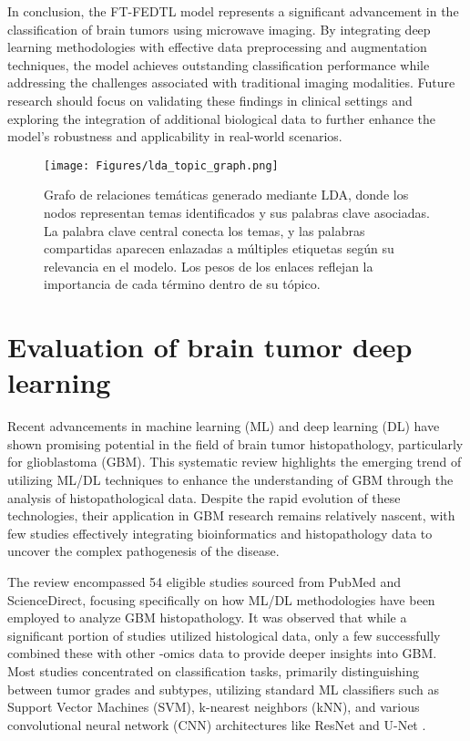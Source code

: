 \documentclass[runningheads]{llncs}
\begin{document}
In conclusion, the FT-FEDTL model represents a significant advancement in the classification of brain tumors using microwave imaging. By integrating deep learning methodologies with effective data preprocessing and augmentation techniques, the model achieves outstanding classification performance while addressing the challenges associated with traditional imaging modalities. Future research should focus on validating these findings in clinical settings and exploring the integration of additional biological data to further enhance the model's robustness and applicability in real-world scenarios.
\begin{figure}[h]
\centering
\texttt{[image: Figures/lda\_topic\_graph.png]}
\caption{Grafo de relaciones temáticas generado mediante LDA, donde los nodos representan temas identificados y sus palabras clave asociadas. La palabra clave central conecta los temas, y las palabras compartidas aparecen enlazadas a múltiples etiquetas según su relevancia en el modelo. Los pesos de los enlaces reflejan la importancia de cada término dentro de su tópico.}
\end{figure}
\section{Evaluation of brain tumor deep learning}
Recent advancements in machine learning (ML) and deep learning (DL) have shown promising potential in the field of brain tumor histopathology, particularly for glioblastoma (GBM). This systematic review highlights the emerging trend of utilizing ML/DL techniques to enhance the understanding of GBM through the analysis of histopathological data. Despite the rapid evolution of these technologies, their application in GBM research remains relatively nascent, with few studies effectively integrating bioinformatics and histopathology data to uncover the complex pathogenesis of the disease. 

The review encompassed 54 eligible studies sourced from PubMed and ScienceDirect, focusing specifically on how ML/DL methodologies have been employed to analyze GBM histopathology. It was observed that while a significant portion of studies utilized histological data, only a few successfully combined these with other -omics data to provide deeper insights into GBM. Most studies concentrated on classification tasks, primarily distinguishing between tumor grades and subtypes, utilizing standard ML classifiers such as Support Vector Machines (SVM), k-nearest neighbors (kNN), and various convolutional neural network (CNN) architectures like ResNet and U-Net \cite{Chun_2025}. 
\end{document}
